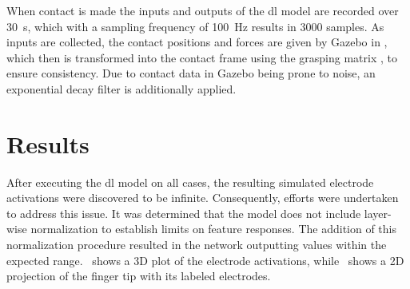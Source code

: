 When contact is made the inputs and outputs of the \gls{dl} model are recorded over \SI{30}{\second}, which with a sampling frequency of \SI{100}{\hertz} results in \num{3000} samples. As inputs are collected, the contact positions and forces are given by Gazebo in , which then is transformed into the contact frame  using the grasping matrix , to ensure consistency. Due to contact data in Gazebo being prone to noise, an exponential decay filter is additionally applied.




\section{Results}\label{sec:1-tactile-perception-results}



After executing the \gls{dl} model on all cases, the resulting simulated electrode activations were discovered to be infinite. Consequently, efforts were undertaken to address this issue. It was determined that the model does not include layer-wise normalization to establish limits on feature responses. The addition of this normalization procedure resulted in the network outputting values within the expected range.~ shows a 3D plot of the electrode activations, while~ shows a 2D projection of the finger tip with its labeled electrodes.

